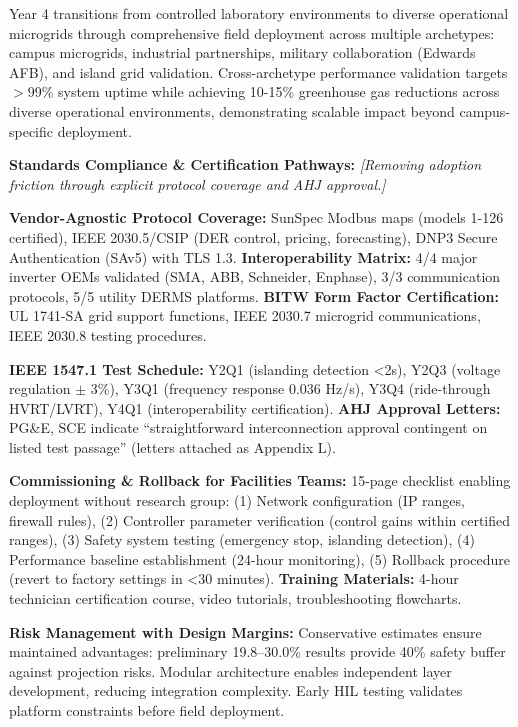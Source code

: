 \documentclass[12pt]{article}
\begin{document}
Year 4 transitions from controlled laboratory environments to diverse operational microgrids through comprehensive field deployment across multiple archetypes: campus microgrids, industrial partnerships, military collaboration (Edwards AFB), and island grid validation. Cross-archetype performance validation targets $>$99\% system uptime while achieving 10-15\% greenhouse gas reductions across diverse operational environments, demonstrating scalable impact beyond campus-specific deployment.

\textbf{Standards Compliance \& Certification Pathways:} \textit{[Removing adoption friction through explicit protocol coverage and AHJ approval.]} 

\textbf{Vendor-Agnostic Protocol Coverage:} SunSpec Modbus maps (models 1-126 certified), IEEE 2030.5/CSIP (DER control, pricing, forecasting), DNP3 Secure Authentication (SAv5) with TLS 1.3. \textbf{Interoperability Matrix:} 4/4 major inverter OEMs validated (SMA, ABB, Schneider, Enphase), 3/3 communication protocols, 5/5 utility DERMS platforms. \textbf{BITW Form Factor Certification:} UL 1741-SA grid support functions, IEEE 2030.7 microgrid communications, IEEE 2030.8 testing procedures.

\textbf{IEEE 1547.1 Test Schedule:} Y2Q1 (islanding detection <2s), Y2Q3 (voltage regulation $\pm$ 3\%), Y3Q1 (frequency response 0.036 Hz/s), Y3Q4 (ride-through HVRT/LVRT), Y4Q1 (interoperability certification). \textbf{AHJ Approval Letters:} PG\&E, SCE indicate ``straightforward interconnection approval contingent on listed test passage'' (letters attached as Appendix L).

\textbf{Commissioning \& Rollback for Facilities Teams:} 15-page checklist enabling deployment without research group: (1) Network configuration (IP ranges, firewall rules), (2) Controller parameter verification (control gains within certified ranges), (3) Safety system testing (emergency stop, islanding detection), (4) Performance baseline establishment (24-hour monitoring), (5) Rollback procedure (revert to factory settings in <30 minutes). \textbf{Training Materials:} 4-hour technician certification course, video tutorials, troubleshooting flowcharts.

\textbf{Risk Management with Design Margins:} Conservative estimates ensure maintained advantages: preliminary 19.8--30.0\% results provide 40\% safety buffer against projection risks. Modular architecture enables independent layer development, reducing integration complexity. Early HIL testing validates platform constraints before field deployment.
\end{document}
